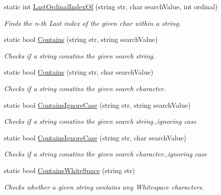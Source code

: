 \begin{DoxyCompactItemize}
static int \hyperlink{class_ultimate_1_1_utilities_1_1_string_utils_acfeaf54531bc51f2716e15b4947ab0ab}{Last\+Ordinal\+Index\+Of} (string str, char search\+Value, int ordinal)
\begin{DoxyCompactList}\small\item\em Finds the n-\/th Last index of the given char within a string. \end{DoxyCompactList}\item 
static bool \hyperlink{class_ultimate_1_1_utilities_1_1_string_utils_ac8613606c790e912b776849365bd8b96}{Contains} (string str, string search\+Value)
\begin{DoxyCompactList}\small\item\em Checks if a string conatins the given search string. \end{DoxyCompactList}\item 
static bool \hyperlink{class_ultimate_1_1_utilities_1_1_string_utils_a9488aee0ccccf0d8649a5f6ff4dbb0c5}{Contains} (string str, char search\+Value)
\begin{DoxyCompactList}\small\item\em Checks if a string conatins the given search character. \end{DoxyCompactList}\item 
static bool \hyperlink{class_ultimate_1_1_utilities_1_1_string_utils_a1aecaff87840f6b011c04b4ba77e5da6}{Contains\+Ignore\+Case} (string str, string search\+Value)
\begin{DoxyCompactList}\small\item\em Checks if a string conatins the given search string.,ignoring case \end{DoxyCompactList}\item 
static bool \hyperlink{class_ultimate_1_1_utilities_1_1_string_utils_a5138ae66c5c708bca985eab4d81c8631}{Contains\+Ignore\+Case} (string str, char search\+Value)
\begin{DoxyCompactList}\small\item\em Checks if a string conatins the given search character.,ignoring case \end{DoxyCompactList}\item 
static bool \hyperlink{class_ultimate_1_1_utilities_1_1_string_utils_a021a48b1cce045db7bf02d8976cfa2ac}{Contains\+White\+Space} (string str)
\begin{DoxyCompactList}\small\item\em Checks whether a given string contains any Whitespace characters. \end{DoxyCompactList}\item 

\end{DoxyCompactItemize}
